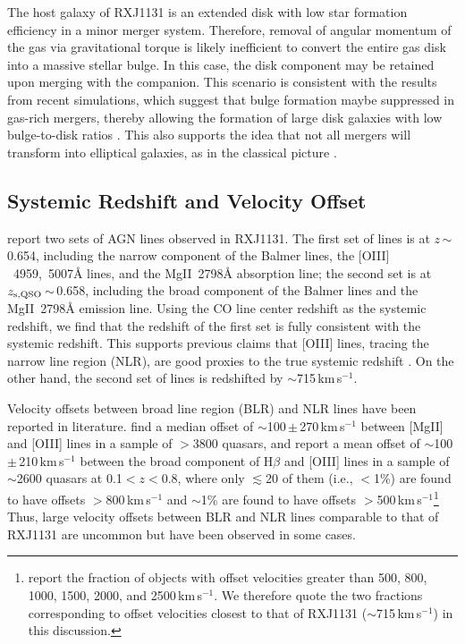 \documentclass[]{emulateapj}
\newcommand{\mgii}{\mbox{Mg{\scriptsize II}~2798\AA}\xspace}
\newcommand{\oiii}{\mbox{$[$O{\scriptsize III}$]$~4959, 5007\AA}\xspace}
\newcommand{\kms}{\mbox{km\,s$^{-1}$}\xspace}
\newcommand{\ssim}{\,$\sim$\,}
\newcommand{\pmm}{\,$\pm$\,}
\begin{document}
The host galaxy of RXJ1131 is an extended disk with low star formation efficiency in a minor merger
system. Therefore, removal of angular momentum of the gas via gravitational torque is likely inefficient to convert the
entire gas disk into a massive stellar bulge.
In this case, the disk component may be retained upon merging with the companion.
This scenario is consistent with the results from recent simulations, which suggest that bulge formation maybe
suppressed in gas-rich mergers, thereby allowing the formation of large disk galaxies with low bulge-to-disk ratios
\citep{Springel05a, Robertson06a, Hopkins09a}. This also supports the idea that not all mergers will transform into
elliptical galaxies, as in the classical picture \citep{Toomre72a}.


\subsection{Systemic Redshift and Velocity Offset}

\citet[]{Sluse07a} report two sets of AGN lines observed in RXJ1131.
The first set of lines is at $z$\ssim0.654, including the narrow component of the Balmer lines, the \oiii lines, and the \mgii absorption line; the second set is at
$z_{\rm s, QSO}$\ssim0.658, including the broad component of the Balmer lines and the \mgii emission line.
Using the CO line center redshift as the systemic redshift,
we find that the redshift of the first set is fully consistent with the systemic redshift. This
supports previous claims that [O{\scriptsize III}] lines, tracing the narrow line region (NLR),
are good proxies
to the true systemic redshift \citep[e.g.,][]{Vrtilek85a, Nelson00a}.
On the other hand, the second set of lines is redshifted by $\sim$715\,\kms.

Velocity offsets between broad line region (BLR) and NLR lines have been reported in literature.
\citet{Richards02a} find a median offset of
$\sim$100\pmm270\,\kms
between [Mg{\scriptsize II}] and [O{\scriptsize III}] lines in a
sample of $>$3800 quasars,
and \citet{Bonning07a} report
a mean offset of
$\sim$100\pmm210\,\kms
between the broad component of
H$\beta$ and [O{\scriptsize III}] lines in a sample of $\sim$2600 quasars at 0.1$<$$z$$<$0.8,
where only $\lesssim$20 of them (i.e., $<$1\%) are found to have offsets $>$800\,\kms
and $\sim$1\%
are found to have offsets $>$500\,\kms \footnote{\citet{Bonning07a} report the fraction of objects with offset velocities greater
than 500, 800, 1000, 1500, 2000, and 2500\,\kms. We therefore quote the two fractions corresponding to
offset velocities closest
to that of RXJ1131 ($\sim$715\,\kms) in this discussion.}
Thus, large velocity offsets between BLR and NLR lines
comparable to that of RXJ1131 are uncommon but have been observed in some cases.
\end{document}
